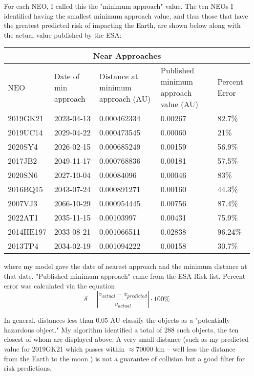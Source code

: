 \documentclass[12pt]{article}
\begin{document}
For each NEO, I called this the "minimum approach" value. The ten NEOs I identified having the smallest minimum approach value, and thus those that have the greatest predicted risk of impacting the Earth, are shown below along with the actual value published by the ESA:
\begin{center}
    \begin{tabular}{|p{2cm}||p{3cm}|p{2.75cm}|p{2.75cm}|p{2cm} |} 
        \hline
        \multicolumn{5}{|c|}{Near Approaches}\\
        \hline
        {\scriptsize NEO}  & {\scriptsize Date of min approach} & {\scriptsize Distance at minimum approach (AU)} & {\scriptsize Published minimum approach value (AU)} & {\scriptsize Percent Error}\\
        \hline
        2019GK21 & 2023-04-13 & 0.000462334 & 0.00267 & 82.7\%\\
        2019UC14 & 2029-04-22 & 0.000473545 & 0.00060 & 21\%\\
        2020SY4  & 2026-02-15 & 0.000685249 & 0.00159 & 56.9\%\\
        2017JB2  & 2049-11-17 & 0.000768836 & 0.00181 & 57.5\%\\
        2020SN6  & 2027-10-04 & 0.00084096  & 0.00046 & 83\%\\
        2016BQ15 & 2043-07-24 & 0.000891271 & 0.00160 & 44.3\% \\
        2007VJ3  & 2066-10-29 & 0.000954445 & 0.00756 & 87.4\%\\
        2022AT1  & 2035-11-15 & 0.00103997  & 0.00431 & 75.9\%\\
        2014HE197& 2033-08-21 & 0.001066511 & 0.02838 & 96.24\%\\ 
        2013TP4  & 2034-02-19 & 0.001094222 & 0.00158 & 30.7\%\\
        \hline
    \end{tabular}
\end{center}

where my model gave the date of nearest approach and the minimum distance at that date. "Published minimum approach" came from the ESA Risk list. Percent error was calculated via the equation
$$\delta = \left| \frac{v_{actual} - v_{predicted}}{v_{actual}}\right| \cdot 100\% $$

In general, distances less than 0.05 AU classify the objects as a "potentially hazardous object." My algorithm identified a total of 288 such objects, the ten closest of whom are displayed above. A very small distance (such as my predicted value for 2019GK21 which passes within $\approx 70000$ km -- well less the distance from the Earth to the moon ) is not a guarantee of collision but a good filter for risk predictions. 
\end{document}
